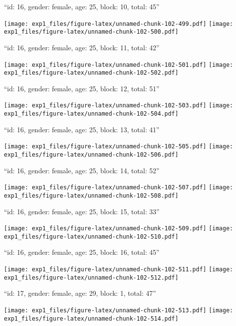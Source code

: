 \documentclass[11pt,,]{article}
\begin{document}
\newpage
[1] 

``id: 16, gender: female, age: 25, block: 10, total: 45''

\texttt{[image: exp1\_files/figure-latex/unnamed-chunk-102-499.pdf]}
\texttt{[image: exp1\_files/figure-latex/unnamed-chunk-102-500.pdf]}

\newpage
[1] 

``id: 16, gender: female, age: 25, block: 11, total: 42''

\texttt{[image: exp1\_files/figure-latex/unnamed-chunk-102-501.pdf]}
\texttt{[image: exp1\_files/figure-latex/unnamed-chunk-102-502.pdf]}

\newpage
[1] 

``id: 16, gender: female, age: 25, block: 12, total: 51''

\texttt{[image: exp1\_files/figure-latex/unnamed-chunk-102-503.pdf]}
\texttt{[image: exp1\_files/figure-latex/unnamed-chunk-102-504.pdf]}

\newpage
[1] 

``id: 16, gender: female, age: 25, block: 13, total: 41''

\texttt{[image: exp1\_files/figure-latex/unnamed-chunk-102-505.pdf]}
\texttt{[image: exp1\_files/figure-latex/unnamed-chunk-102-506.pdf]}

\newpage
[1] 

``id: 16, gender: female, age: 25, block: 14, total: 52''

\texttt{[image: exp1\_files/figure-latex/unnamed-chunk-102-507.pdf]}
\texttt{[image: exp1\_files/figure-latex/unnamed-chunk-102-508.pdf]}

\newpage
[1] 

``id: 16, gender: female, age: 25, block: 15, total: 33''

\texttt{[image: exp1\_files/figure-latex/unnamed-chunk-102-509.pdf]}
\texttt{[image: exp1\_files/figure-latex/unnamed-chunk-102-510.pdf]}

\newpage
[1] 

``id: 16, gender: female, age: 25, block: 16, total: 45''

\texttt{[image: exp1\_files/figure-latex/unnamed-chunk-102-511.pdf]}
\texttt{[image: exp1\_files/figure-latex/unnamed-chunk-102-512.pdf]}

\newpage
[1] 

``id: 17, gender: female, age: 29, block: 1, total: 47''

\texttt{[image: exp1\_files/figure-latex/unnamed-chunk-102-513.pdf]}
\texttt{[image: exp1\_files/figure-latex/unnamed-chunk-102-514.pdf]}
\end{document}
